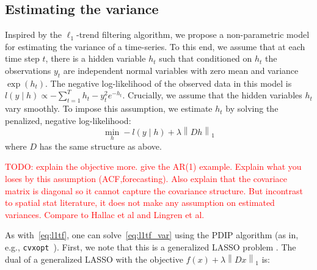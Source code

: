 \documentclass{article}
\newcommand{\attn}[1]{\textcolor{red}{TODO: #1}}
\newcommand{\given}{\;\vert\;}
\newcommand{\norm}[1]{\left\lVert #1 \right\rVert}
\begin{document}

\subsection{Estimating the variance}
\label{sec:l1tf_var}


Inspired by the $\ell_1$-trend filtering algorithm, we propose a
non-parametric model for estimating the variance of a time-series. To
this end, we assume that at each time step $t$, there is a hidden
variable $h_t$ such that conditioned on $h_t$ the observations $y_t$
are independent normal variables with zero mean and variance
$\exp(h_t)$. The negative log-likelihood of the observed data in this
model is $l(y\given h) \propto -\sum_{t=1}^T h_t - y_t^2e^{-h_t}$. Crucially,
we assume that the hidden variables $h_t$ vary smoothly. To impose
this assumption, we estimate $h_t$ by solving the penalized, negative
log-likelihood: 
\begin{equation}
\min_h -l(y\given h)+\lambda \norm{ Dh }_1
\label{eq:l1tf_var}
\end{equation}
 where $D$ has the same structure as above.

\attn{explain the objective more. give the AR(1) example. Explain what
  you loses by this assumption (ACF,forecasting). Also explain that
  the covariace matrix is diagonal so it cannot capture the covariance
  structure. But incontrast to spatial stat literature, it does not
  make any assumption on estimated variances. Compare to Hallac et al
  and Lingren et al.} 

As with~\eqref{eq:l1tf}, one can solve~\eqref{eq:l1tf_var} using the
PDIP algorithm (as in, e.g.,
\texttt{cvxopt}~\citep{andersen_cvxopt:_2013}). First, we note that
this is a generalized LASSO problem
\citep{tibshirani_solution_2011}. The dual of a generalized LASSO with
the objective $f(x)+\lambda \norm{ Dx }_1$ is:  
\end{document}
